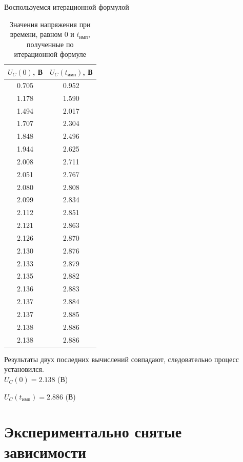 	Воспользуемся итерационной формулой
\begin{table}[H]

	\begin{center}
	\caption{Значения напряжения при времени, равном $0$ и $t_\text{имп}$, полученные по итерационной формуле}
	\begin{tabular}{|c|c|}
		\hline 
		$U_C(0)$, В & $U_C(t_\text{имп})$, В \\ 
		\hline 
		0.705 & 0.952 \\ 
		\hline 
		1.178 & 1.590 \\ 
		\hline 
		1.494 & 2.017 \\ 
		\hline 
		1.707 & 2.304 \\ 
		\hline 
		1.848 & 2.496 \\ 
		\hline 
		1.944 & 2.625 \\ 
		\hline 
		2.008 & 2.711 \\ 
		\hline 
		2.051 & 2.767 \\ 
		\hline 
		2.080 & 2.808 \\ 
		\hline 
		2.099 & 2.834 \\ 
		\hline 
		2.112 & 2.851 \\ 
		\hline 
		2.121 & 2.863 \\ 
		\hline 
		2.126 & 2.870 \\ 
		\hline 
		2.130 & 2.876 \\ 
		\hline 
		2.133 & 2.879 \\ 
		\hline 
		2.135 & 2.882 \\ 
		\hline 
		2.136 & 2.883 \\ 
		\hline 
		2.137 & 2.884 \\ 
		\hline 
		2.137 & 2.885 \\ 
		\hline 
		2.138 & 2.886 \\ 
		\hline 
		2.138 & 2.886 \\ 
		\hline 
		\end{tabular}  	
		
	\end{center}
\end{table}
	Результаты двух последних вычислений совпадают, следовательно процесс установился.\\
	
	$U_C(0) = 2.138$ (В)
	
	$U_C(t_\text{имп}) = 2.886$ (В)

\section{Экспериментально снятые зависимости}

